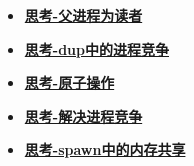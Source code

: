 \begin{itemize}
	\item \hyperref[think-father-reader]{\textbf{\textcolor{baseB}{思考-父进程为读者}}}
	\item \hyperref[think-dup]{\textbf{\textcolor{baseB}{思考-dup中的进程竞争}}}
	\item \hyperref[think-automatic]{\textbf{\textcolor{baseB}{思考-原子操作}}}
	\item \hyperref[think-race]{\textbf{\textcolor{baseB}{思考-解决进程竞争}}}
	\item \hyperref[think-spawn]{\textbf{\textcolor{baseB}{思考-spawn中的内存共享}}}
\end{itemize}





